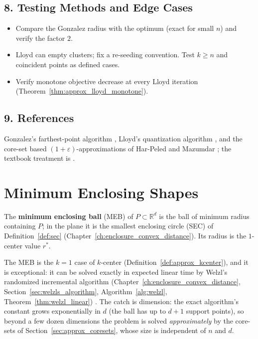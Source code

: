 \subsection{8. Testing Methods and Edge Cases}

\begin{itemize}
\item Compare the Gonzalez radius with the optimum (exact for small $n$) and
  verify the factor $2$.
\item Lloyd can empty clusters; fix a re-seeding convention. Test
  $k \geq n$ and coincident points as defined cases.
\item Verify monotone objective decrease at every Lloyd iteration
  (Theorem~\ref{thm:approx_lloyd_monotone}).
\end{itemize}

\subsection{9. References}

Gonzalez's farthest-point algorithm \cite{gonzalez1985}, Lloyd's
quantization algorithm \cite{lloyd1982}, and the core-set based
$(1 + \varepsilon)$-approximations of Har-Peled and Mazumdar
\cite{harpeled2004}; the textbook treatment is \cite{deberg2008,harpeled2011}.


\section{Minimum Enclosing Shapes}
\label{sec:approx_enclosing}

\begin{definition}\label{def:approx_meb}
  The \textbf{minimum enclosing ball} (MEB) of $P \subset \mathbb{R}^d$ is
  the ball of minimum radius containing $P$; in the plane it is the smallest
  enclosing circle (SEC) of Definition~\ref{def:sec}
  (Chapter~\ref{ch:enclosure_convex_distance}). Its radius is the
  $1$-center value $r^*$.
\end{definition}

The MEB is the $k = 1$ case of $k$-center
(Definition~\ref{def:approx_kcenter}), and it is exceptional: it can be
solved exactly in expected linear time by Welzl's randomized incremental
algorithm (Chapter~\ref{ch:enclosure_convex_distance},
Section~\ref{sec:welzls_algorithm}, Algorithm~\ref{alg:welzl},
Theorem~\ref{thm:welzl_linear}) \cite{welzl1991,megiddo1983}. The catch is
dimension: the exact algorithm's constant grows exponentially in $d$
(the ball has up to $d + 1$ support points), so beyond a few dozen
dimensions the problem is solved \emph{approximately} by the core-sets of
Section~\ref{sec:approx_coresets}, whose size is independent of $n$ and $d$.

